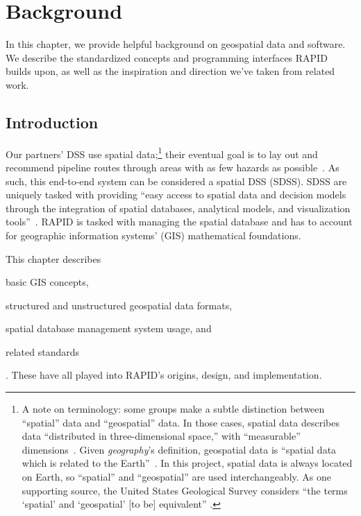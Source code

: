 \chapter{Background}
\label{background}

In this chapter, we provide helpful background on geospatial data and software. We describe the standardized concepts and programming interfaces RAPID builds upon, as well as the inspiration and direction we've taken from related work.

\section{Introduction}
\label{background_intro}
Our partners' DSS use spatial data;\footnote{A note on terminology: some groups make a subtle distinction between ``spatial'' data and ``geospatial'' data. In those cases, spatial data describes data ``distributed in three-dimensional space,'' with ``measurable'' dimensions~\cite{Bhatta2011}. Given \textit{geography}'s definition, geospatial data is ``spatial data which is related to the Earth''~\cite{Bhatta2011}. In this project, spatial data is always located on Earth, so ``spatial'' and ``geospatial'' are used interchangeably. As one supporting source, the United States Geological Survey considers ``the terms `spatial' and `geospatial' [to be] equivalent''
\cite{Bhatta2011}.} their eventual goal is to lay out and recommend pipeline routes through areas with as few hazards as possible~\cite{Dunning2013}. As such, this end-to-end system can be considered a spatial DSS (SDSS). SDSS are uniquely tasked with providing ``easy access to spatial data and decision models through the integration of spatial databases, analytical models, and visualization tools''~\cite{RedlandsSDSS}. RAPID is tasked with managing the spatial database and has to account for geographic information systems' (GIS) mathematical foundations.

This chapter describes \begin{enumerate*}[label=\itshape\alph*\upshape)]
\item basic GIS concepts,
\item structured and unstructured geospatial data formats,
\item spatial database management system usage, and
\item related standards
\end{enumerate*}. These have all played into RAPID's origins, design, and implementation.

